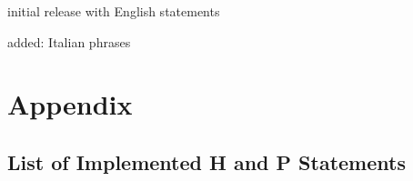 \documentclass[a4paper,notitlepage]{scrreprt}
\begin{document}
\begin{compactitem}
\item initial release with English statements
\end{compactitem}

\begin{compactitem}
  \item added: Italian phrases
\end{compactitem}



\appendix
\chapter{Appendix}

\section{List of Implemented H and P Statements}
\end{document}
